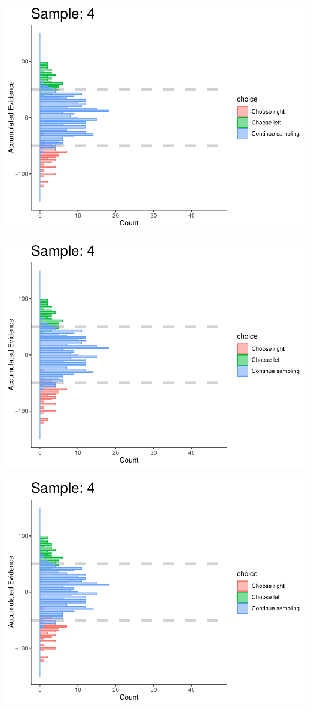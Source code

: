 \documentclass[
]{book}
\begin{document}
\begin{center}\includegraphics[width=0.8\linewidth]{LateNightBayes_files/figure-latex/fixed_check-31} \end{center}

\begin{center}\includegraphics[width=0.8\linewidth]{LateNightBayes_files/figure-latex/fixed_check-32} \end{center}

\begin{center}\includegraphics[width=0.8\linewidth]{LateNightBayes_files/figure-latex/fixed_check-33} \end{center}
\end{document}
